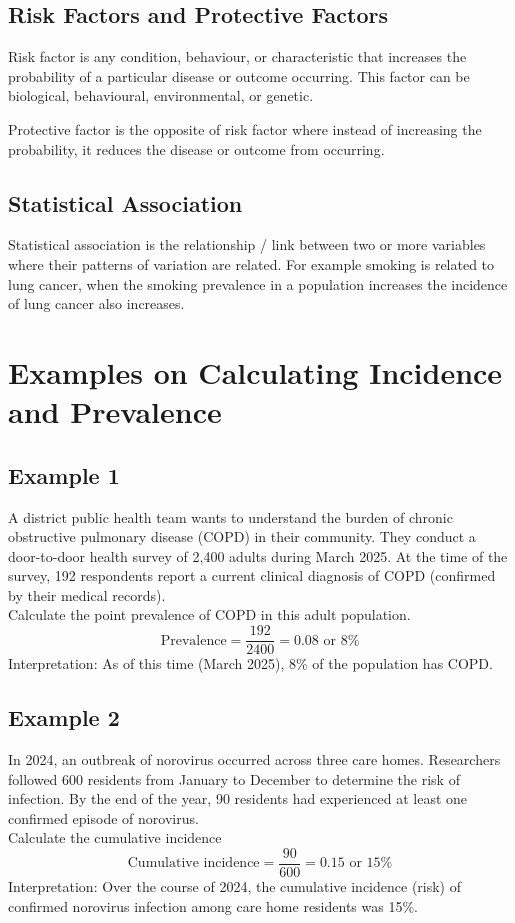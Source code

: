 \documentclass{article}
\begin{document}
\subsection{Risk Factors and Protective Factors}
Risk factor is any condition, behaviour, or characteristic that increases the probability of a particular disease
or outcome occurring. This factor can be biological, behavioural, environmental, or genetic.

Protective factor is the opposite of risk factor where instead of increasing the probability, it reduces the
disease or outcome from occurring.


\subsection{Statistical Association}
Statistical association is the relationship / link between two or more variables where their patterns of variation
are related. For example smoking is related to lung cancer, when the smoking prevalence in a population increases
the incidence of lung cancer also increases.

\pagebreak
\section{Examples on Calculating Incidence and Prevalence}
\subsection{Example 1}
A district public health team wants to understand the burden of chronic obstructive
pulmonary disease (COPD) in their community. They conduct a door-to-door health
survey of 2,400 adults during March 2025. At the time of the survey, 192 respondents
report a current clinical diagnosis of COPD (confirmed by their medical records).
\\
Calculate the point prevalence of COPD in this adult population.
\\
\begin{equation*}
    \text{Prevalence} = \dfrac{192}{2400} = 0.08 \text{ or 8\%}
\end{equation*}
Interpretation: As of this time (March 2025), 8\% of the population has COPD.

\subsection{Example 2}
In 2024, an outbreak of norovirus occurred across three care homes. Researchers
followed 600 residents from January to December to determine the risk of infection. By
the end of the year, 90 residents had experienced at least one confirmed episode of
norovirus.
\\
Calculate the cumulative incidence
\\
\begin{equation*}
    \text{Cumulative incidence} = \dfrac{90}{600} = 0.15 \text{ or 15\%}
\end{equation*}
Interpretation: Over the course of 2024, the cumulative incidence (risk) of confirmed norovirus infection among care home residents was 15\%.
\end{document}
